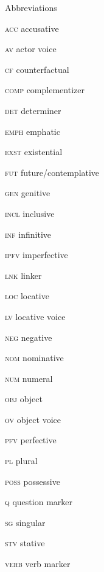 \begin{stylelsUnNumberedSection}
Abbreviations
\end{stylelsUnNumberedSection}

\textsc{acc}  accusative

\textsc{av}  actor voice

\textsc{cf}  counterfactual

\textsc{comp}  complementizer

\textsc{det}  determiner

\textsc{emph}  emphatic

\textsc{exst}  existential

\textsc{fut}  future/contemplative

\textsc{gen}  genitive

\textsc{incl}  inclusive

\textsc{inf}  infinitive

\textsc{ipfv}  imperfective

\textsc{lnk}  linker

\textsc{loc}  locative

\textsc{lv}  locative voice

\textsc{neg}  negative

\textsc{nom}  nominative

\textsc{num}  numeral

\textsc{obj}  object

\textsc{ov}  object voice

\textsc{pfv}  perfective

\textsc{pl}  plural

\textsc{poss}  possessive

\textsc{q}  question marker

\textsc{sg}  singular

\textsc{stv}  stative

\textsc{verb}  verb marker


